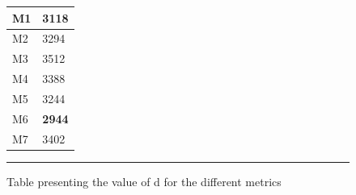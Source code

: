 \begin{figure}[htbp]
    \centering
    \begin{tabular}{|l|l|}
        \hline
        M1 & 3118 \\ \hline
        M2 & 3294 \\ \hline
        M3 & 3512 \\ \hline
        M4 & 3388 \\ \hline
        M5 & 3244 \\ \hline
        M6 & \textbf{2944} \\ \hline
        M7 & 3402 \\
        \hline
    \end{tabular}
    \label{fig:metrics}
    \rule{35em}{0.5pt}
    \caption[Table presenting the value of d for the different metrics ]{Table presenting the value of d for the different metrics}
\end{figure}








